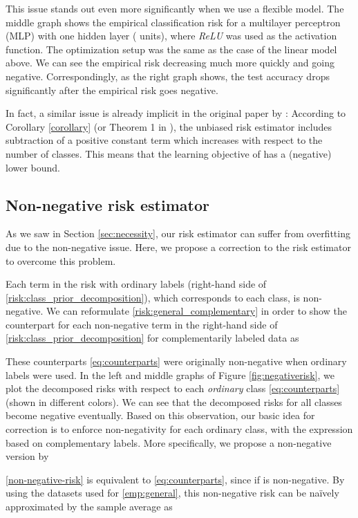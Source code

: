 \documentclass{article}
\begin{document}
This issue stands out even more significantly when we use a flexible model.  The middle graph shows the empirical classification risk for a multilayer perceptron (MLP) with one hidden layer ( units), where \emph{ReLU} \citep{relu} was used as the activation function.
The optimization setup was the same as the case of the linear model above.
We can see the empirical risk decreasing much more quickly and going negative.
Correspondingly, as the right graph shows, the test accuracy drops significantly after the empirical risk goes negative.

In fact, a similar issue is already implicit in the original paper by \citet{ishida17nips}: According to Corollary \ref{corollary} (or Theorem 1 in \citet{ishida17nips}), the unbiased risk estimator includes subtraction of a positive constant term which increases with respect to the number of classes.
This means that the learning objective of \citet{ishida17nips} has a (negative) lower bound.

\subsection{Non-negative risk estimator}
\label{sc:nn_risk_estimator}
As we saw in Section \ref{sec:necessity}, our risk estimator can suffer from overfitting due to the non-negative issue.
Here, we propose a correction to the risk estimator to overcome this problem.

Each term in the risk with ordinary labels (right-hand side of \eqref{risk:class_prior_decomposition}), which corresponds to each class, is non-negative.
We can reformulate \eqref{risk:general_complementary} in order to show the counterpart for each non-negative term in the right-hand side of \eqref{risk:class_prior_decomposition} for complementarily labeled data as

These counterparts \eqref{eq:counterparts} were originally non-negative when ordinary labels were used.
In the left and middle graphs of Figure \ref{fig:negativerisk}, we plot the decomposed risks with respect to each \emph{ordinary} class \eqref{eq:counterparts} (shown in different colors).
We can see that the decomposed risks for all classes become negative eventually.
Based on this observation, our basic idea for correction is to enforce non-negativity for each ordinary class, with the expression based on complementary labels.
More specifically, we propose a non-negative version by

\eqref{non-negative-risk} is equivalent to \eqref{eq:counterparts}, since  if  is non-negative.
By using the datasets used for \eqref{emp:general}, this non-negative risk can be na\"ively approximated by the sample average as
\end{document}
